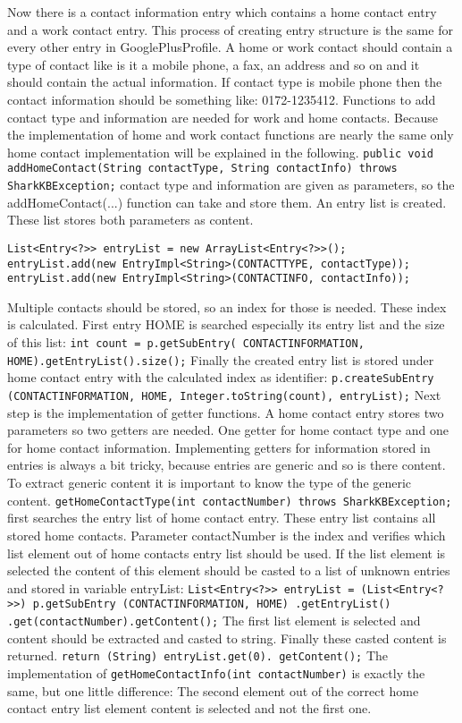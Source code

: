 \documentclass[12pt]{article}
\begin{document}
Now there is a contact information entry which contains a home contact entry and a work contact entry. This process of creating entry structure is the same for every other entry in GooglePlusProfile. A home or work contact should contain a type of contact like is it a mobile phone, a fax, an address and so on and it should contain the actual information. If contact type is mobile phone then the contact information should be something like: 0172-1235412. Functions to add contact type and information are needed for work and home contacts. Because the implementation of home and work contact functions are nearly the same only home contact implementation will be explained in the following. {\tt public void addHomeContact(String contactType, String contactInfo) throws SharkKBException;} contact type and information are given as parameters, so the addHomeContact(...) function can take and store them. An entry list is created. These list stores both parameters as content. 
\begin{verbatim}
List<Entry<?>> entryList = new ArrayList<Entry<?>>();
entryList.add(new EntryImpl<String>(CONTACTTYPE, contactType));
entryList.add(new EntryImpl<String>(CONTACTINFO, contactInfo));
\end{verbatim}        

Multiple contacts should be stored, so an index for those is needed. These index is calculated. First entry HOME is searched especially its entry list and the size of this list: {\tt int count = p.getSubEntry( CONTACTINFORMATION, HOME).getEntryList().size();} Finally the created entry list is stored under home contact entry with the calculated index as identifier: {\tt p.createSubEntry (CONTACTINFORMATION, HOME, Integer.toString(count), entryList);} Next step is the implementation of getter functions. A home contact entry stores two parameters so two getters are needed. One getter for home contact type and one for home contact information. Implementing getters for information stored in entries is always a bit tricky, because entries are generic and so is there content. To extract generic content it is important to know the type of the generic content. {\tt getHomeContactType(int contactNumber) throws SharkKBException; }  first searches the entry list of home contact entry. These entry list contains all stored home contacts. Parameter contactNumber is the index and verifies which list element out of home contacts entry list should be used. If the list element is selected the content of this element should be casted to a list of unknown entries and stored in variable entryList: {\tt List<Entry<?>> entryList =  (List<Entry<?>>)  p.getSubEntry (CONTACTINFORMATION, HOME) .getEntryList() .get(contactNumber).getContent();} The first list element is selected and content should be extracted and casted to string. Finally these casted content is returned. {\tt return (String) entryList.get(0). getContent();} The implementation of {\tt getHomeContactInfo(int contactNumber)} is exactly the same, but one little difference: The second element out of the correct home contact entry list element content is selected and not the first one.
\end{document}
